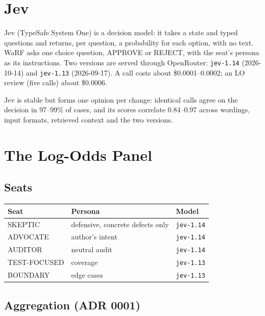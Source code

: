 \documentclass[11pt,a4paper]{article}
\begin{document}
\section{Jev}

Jev (TypeSafe System One) is a decision model: it takes a state and typed
questions and returns, per question, a probability for each option, with no
text. WaRF asks one choice question, APPROVE or REJECT, with the seat's persona
as its instructions. Two versions are served through OpenRouter:
\texttt{jev-1.14} (2026-10-14) and \texttt{jev-1.13} (2026-09-17). A call costs
about \$0.0001--0.0002; an LO review (five calls) about \$0.0006.

Jev is stable but forms one opinion per change: identical calls agree on the
decision in 97--99\% of cases, and its scores correlate 0.84--0.97 across
wordings, input formats, retrieved context and the two versions.

\section{The Log-Odds Panel}

\subsection{Seats}

\begin{center}
\begin{tabular}{lll}
\toprule
Seat & Persona & Model \\
\midrule
SKEPTIC      & defensive, concrete defects only & \texttt{jev-1.14} \\
ADVOCATE     & author's intent                  & \texttt{jev-1.14} \\
AUDITOR      & neutral audit                    & \texttt{jev-1.14} \\
TEST-FOCUSED & coverage                         & \texttt{jev-1.13} \\
BOUNDARY     & edge cases                       & \texttt{jev-1.13} \\
\bottomrule
\end{tabular}
\end{center}

\subsection{Aggregation (ADR 0001)}
\end{document}

